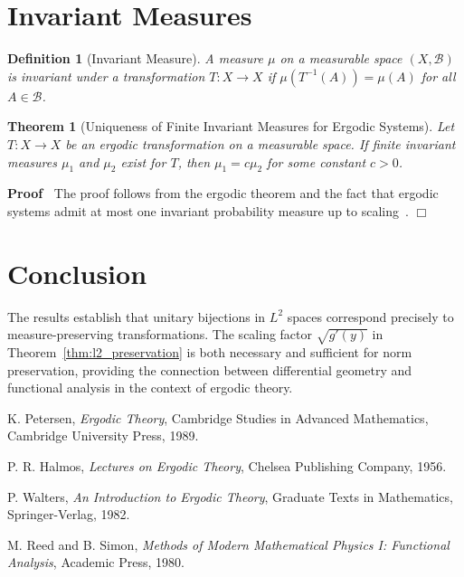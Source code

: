\documentclass{article}
\newcommand{\tmem}[1]{{\em #1\/}}
\newenvironment{proof}{\noindent\textbf{Proof\ }}{\hspace*{\fill}$\Box$\medskip}
\newtheorem{definition}{Definition}
\newtheorem{theorem}{Theorem}
\begin{document}
\section{Invariant Measures}

\begin{definition}
  [Invariant Measure]\label{def:invariant}A measure $\mu$ on a measurable
  space $(X, \mathcal{B})$ is invariant under a transformation $T : X \to X$
  if $\mu (T^{- 1} (A)) = \mu (A)$ for all $A \in \mathcal{B}$.
\end{definition}

\begin{theorem}
  [Uniqueness of Finite Invariant Measures for Ergodic
  Systems]\label{thm:invariant_unique}Let $T : X \to X$ be an ergodic
  transformation on a measurable space. If finite invariant measures $\mu_1$
  and $\mu_2$ exist for $T$, then $\mu_1 = c \mu_2$ for some constant $c > 0$.
\end{theorem}

\begin{proof}
  The proof follows from the ergodic theorem and the fact that ergodic systems
  admit at most one invariant probability measure up to
  scaling~{\cite{petersen1989ergodic}}.
\end{proof}

\section{Conclusion}

The results establish that unitary bijections in $L^2$ spaces correspond
precisely to measure-preserving transformations. The scaling factor $\sqrt{g'
(y)}$ in Theorem~\ref{thm:l2_preservation} is both necessary and sufficient
for norm preservation, providing the connection between differential geometry
and functional analysis in the context of ergodic theory.

\begin{thebibliography}{9}
  {}K. Petersen, {\tmem{Ergodic Theory}},
  Cambridge Studies in Advanced Mathematics, Cambridge University Press, 1989.
  
  {}P. R. Halmos, {\tmem{Lectures on Ergodic
  Theory}}, Chelsea Publishing Company, 1956.
  
  {}P. Walters, {\tmem{An Introduction to
  Ergodic Theory}}, Graduate Texts in Mathematics, Springer-Verlag, 1982.
  
  {}M. Reed and B. Simon, {\tmem{Methods of Modern
  Mathematical Physics I: Functional Analysis}}, Academic Press, 1980.
\end{thebibliography}
\end{document}
